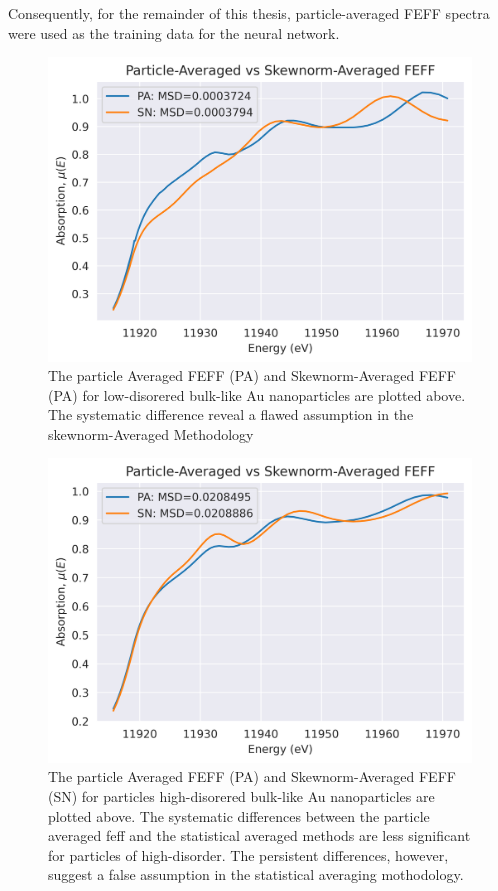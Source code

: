 Consequently, for the remainder of this thesis, particle-averaged FEFF spectra were used as the training data for the neural network.

\begin{figure}[!h]
	\centering
	
	\includegraphics[width=.75\linewidth]{Chapters/Figures/PA-vs-skewnorm-newvals.png}
	\caption[Particle-Averaged vs. Skewnorm-Averaged FEFF Low-Disorder]{The particle Averaged FEFF (PA) and Skewnorm-Averaged FEFF (PA) for low-disorered bulk-like Au nanoparticles are plotted above. The systematic difference reveal a flawed assumption in the skewnorm-Averaged Methodology}
	\label{fig:pa-vs-sknm-feff}
\end{figure}

\begin{figure}[!h]
	\centering
	
	\includegraphics[width=.75\linewidth]{Chapters/Figures/PA-vs-skewnorm-newvals-large-msd.png}
	\caption[Particle-Averaged vs. Skewnorm-Averaged FEFF High-Disorder]{The particle Averaged FEFF (PA) and Skewnorm-Averaged FEFF (SN) for particles high-disorered bulk-like Au nanoparticles are plotted above. The systematic differences between the particle averaged feff and the statistical averaged methods are less significant for particles of high-disorder. The persistent differences, however, suggest a false assumption in the statistical averaging mothodology.}
	\label{fig:pa-vs-sknm-feff-bigmsd}
\end{figure}


